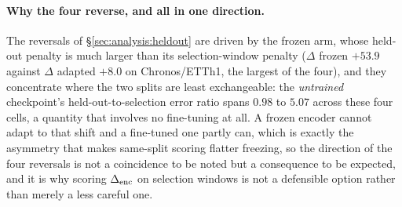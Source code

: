 \paragraph{Why the four reverse, and all in one direction.}
The reversals of \S\ref{sec:analysis:heldout} are driven by the frozen arm, whose
held-out penalty is much larger than its selection-window penalty ($\Delta$ frozen
$+53.9$ against $\Delta$ adapted $+8.0$ on Chronos/ETTh1, the largest of the four),
and they concentrate where the two splits are least exchangeable: the
\emph{untrained} checkpoint's held-out-to-selection error ratio spans $0.98$ to
$5.07$ across these four cells, a quantity that involves no fine-tuning at all.  A
frozen encoder cannot adapt to that shift and a fine-tuned one partly can, which is
exactly the asymmetry that makes same-split scoring flatter freezing, so the
direction of the four reversals is not a coincidence to be noted but a consequence
to be expected, and it is why scoring $\Delta_\text{enc}$ on selection windows is not a
defensible option rather than merely a less careful one.


\begin{table}[ht]
\centering
\caption{\textbf{Cross-backbone results ($h{=}24$)}
(\S\ref{sec:forecasting:nonmoirai}). Every non-Moirai cell with a paired
frozen-encoder run: \textbf{selection-split} gate $\Vb{\text{ridge}}$
(\textsuperscript{f}${=}$gate-fail at the $0.20$ operating point; all nine
fail, as does the screened-only TimesFM/Electricity cell, which has no paired run
and so no selection-split gate: it scores $+0.132$ on the held-out windows), CKA
after full fine-tuning, and the two outcome readings as \% change against
zero-shot (\emph{negative is better than zero-shot}). \textbf{Protocol note:}
this arm is univariate OT, lookback 96, $h{=}24$, 200 held-out windows,
per-window $z$-scored; the Moirai arm of \S\ref{sec:forecasting} is lookback
192, $h{=}96$, 300 windows, train-normalised. Gates for both arms come from one
source (\texttt{results/gate\_val\_side.json}, via
\texttt{scripts/cell\_matrix.py}); the two arms are never pooled.}
\label{tab:crossbackbone}

\end{table}


